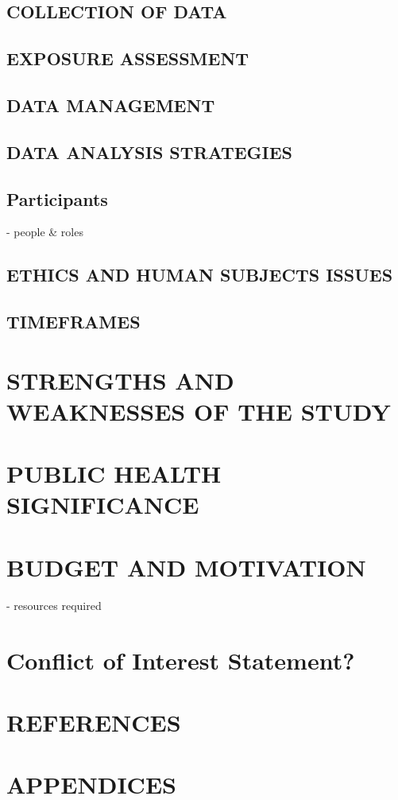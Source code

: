 \documentclass[a4paper, amsfonts, amssymb, amsmath, reprint, showkeys, nofootinbib, twoside]{revtex4-1}
\begin{document}
\subsection{COLLECTION OF DATA}
\subsection{EXPOSURE ASSESSMENT}
\subsection{DATA MANAGEMENT}
\subsection{DATA ANALYSIS STRATEGIES}

\subsection{Participants}
- people & roles

\subsection{ETHICS AND HUMAN SUBJECTS ISSUES}
\subsection{TIMEFRAMES}

\section{STRENGTHS AND WEAKNESSES OF THE STUDY}
\section{PUBLIC HEALTH SIGNIFICANCE}
\section{BUDGET AND MOTIVATION}
- resources required

\section{Conflict of Interest Statement?}

\section{REFERENCES}
\section{APPENDICES}
\end{document}
